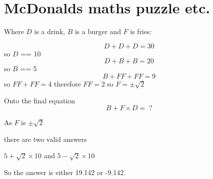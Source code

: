 \documentclass[a4paper,10pt]{article}
\title{}
\author{}
\begin{document}
\maketitle

\begin{abstract}

\end{abstract}

\section{McDonalds maths puzzle etc.}

Where $D$ is a drink, $B$ is a burger and $F$ is fries:

$$ D + D + D = 30 $$
so $D$ == 10
$$ D + B + B = 20 $$
so $B$ == 5
$$ B + FF + FF = 9 $$
so $FF + FF = 4$ therefore $FF=2$ so $F=\pm \sqrt{2}$

Onto the final equation
$$B + F \times D = \; ? $$

As $F$ is  $\pm \sqrt{2}$ 

there are two valid answers

$ 5 + \sqrt{2} \times 10 $ and $ 5 - \sqrt{2} \times 10 $

So the answer is either 19.142 or -9.142.
\end{document}
